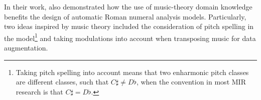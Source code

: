

In their work, \textcite{micchi2020not} also demonstrated
how the use of music-theory domain knowledge benefits the
design of automatic Roman numeral analysis models.
Particularly, two ideas inspired by music theory included
the consideration of pitch spelling in the
model\footnote{Taking pitch spelling into account means that
two enharmonic pitch classes are different classes, such
that $C\sharp \neq D\flat$, when the convention in most MIR
research is that $C\sharp = D\flat$.} and taking modulations
into account when transposing music for data augmentation.
